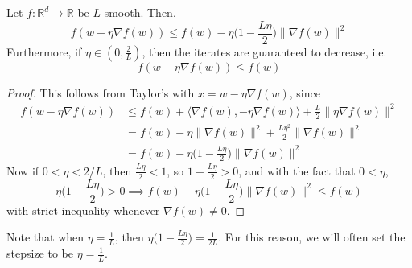 	\begin{lemma}
	  \label{thm:descent-lemma}
		Let $f: \mathbb{R}^d \to \mathbb{R}$ be $L$-smooth. Then, 
		\begin{equation}
			f(w - \eta \nabla f(w)) \leq f(w) - \eta \big(1 - \frac{L \eta}{2} \big) \|\nabla f(w)\|^2
		\end{equation}
		Furthermore, if $\eta \in (0, \frac{2}{L})$, then the iterates are guaranteed to decrease, i.e. 
		\begin{equation}
			f(w - \eta \nabla f(w)) \leq f(w) 
		\end{equation}
	\end{lemma}
	\begin{proof}
	  This follows from Taylor's with $x = w - \eta \nabla f(w)$, since 
		\begin{align}
			f(w - \eta \nabla f(w)) & \leq f(w) + \langle \nabla f(w), - \eta \nabla f(w) \rangle + \frac{L}{2} \| \eta \nabla f(w)\|^2 \\ 
															& = f(w) - \eta \|\nabla f(w)\|^2 + \frac{L \eta^2}{2} \| \nabla f(w)\|^2 \\ 
															& = f(w) - \eta \big( 1 - \frac{L\eta}{2} \big) \|\nabla f(w)\|^2
		\end{align}
		Now if $0 < \eta < 2/L$, then $\frac{L\eta}{2} < 1$, so $1 - \frac{L\eta}{2} > 0$, and with the fact that $0 < \eta$, 
		\begin{equation}
			\eta \big( 1 - \frac{L\eta}{2} \big) > 0 \implies f(w) - \eta \big( 1 - \frac{L\eta}{2} \big) \|\nabla f(w)\|^2 \leq f(w)
		\end{equation} 
		with strict inequality whenever $\nabla f(w) \neq 0$. 
	\end{proof}
	
	Note that when $\eta = \frac{1}{L}$, then $\eta \big( 1 - \frac{L \eta}{2} \big) = \frac{1}{2L}$. For this reason, we will often set the stepsize to be $\eta = \frac{1}{L}$. 

